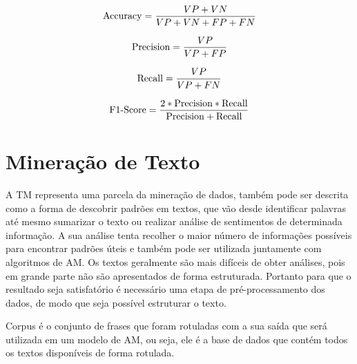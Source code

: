           \begin{equation}\label{acuracia}
            \begin{aligned}
              \textup{Accuracy} = \frac{VP+VN}{VP+VN+FP+FN}
          \end{aligned} 
          \end{equation}

          \begin{equation}\label{precision}
            \begin{aligned}
              \textup{Precision} = \frac{VP}{VP+FP}
          \end{aligned} 
          \end{equation}

          \begin{equation}\label{recall}
            \begin{aligned}
              \textup{Recall} = \frac{VP}{VP+FN}
          \end{aligned} 
          \end{equation}


          \begin{equation}\label{f1score}
            \begin{aligned}
              \textup{F$1$-Score} = \frac{2*\textup{Precision}*\textup{Recall}}{\textup{Precision}+\textup{Recall}}
          \end{aligned} 
          \end{equation}

\section{Mineração de Texto}

          A \acrshort{TM} representa uma parcela da mineração de dados, também pode ser descrita como a forma 
        de descobrir padrões em textos, que vão desde identificar palavras até mesmo sumarizar o texto ou realizar análise de sentimentos
        de determinada informação. A sua análise tenta recolher o maior número de informações possíveis para encontrar padrões úteis e também 
        pode ser utilizada juntamente com algoritmos de \acrshort{AM}. Os textos geralmente são mais difíceis de obter análises, pois em grande
        parte não são apresentados de forma estruturada. Portanto para que o resultado seja satisfatório é necessário uma etapa de pré-processamento
        dos dados, de modo que seja possível estruturar o texto.

            Corpus é o conjunto de frases que foram rotuladas com a sua saída que será utilizada em um modelo de \acrshort{AM}, ou seja, ele é 
        a base de dados que contém todos os textos disponíveis de forma rotulada.

